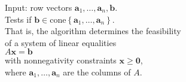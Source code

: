 \documentclass[preview]{standalone}
\renewcommand{\vec}{\mathbf}
\begin{document}
\begin{center}
Input: row vectors $\vec{a}_1,\ldots,\vec{a}_n, \vec{b}$.\\Tests if $\vec{b}\in\text{cone}\left\lbrace\vec{a}_1,\ldots,\vec{a}_n\right\rbrace$.\\That is, the algorithm determines the feasibility\\of a system of linear equalities\\$A\vec{x}=\vec{b}$\\with nonnegativity constraints $\vec{x}\geq\vec{0}$,\\where $\vec{a}_1,\ldots,\vec{a}_n$ are the columns of $A$.
\end{center}
\end{document}
